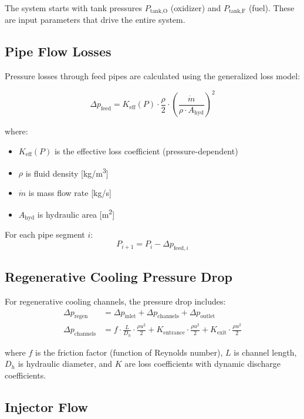 \documentclass[12pt,a4paper]{article}
\newcommand{\mdot}{\dot{m}}
\newcommand{\PtankO}{P_{\text{tank,O}}}
\newcommand{\PtankF}{P_{\text{tank,F}}}
\begin{document}
The system starts with tank pressures $\PtankO$ (oxidizer) and $\PtankF$ (fuel). These are input parameters that drive the entire system.

\subsection{Pipe Flow Losses}

Pressure losses through feed pipes are calculated using the generalized loss model:

\begin{equation}
\Delta p_{\text{feed}} = K_{\text{eff}}(P) \cdot \frac{\rho}{2} \cdot \left(\frac{\mdot}{\rho \cdot A_{\text{hyd}}}\right)^2
\end{equation}

where:
\begin{itemize}
    \item $K_{\text{eff}}(P)$ is the effective loss coefficient (pressure-dependent)
    \item $\rho$ is fluid density [\si{kg/m^3}]
    \item $\mdot$ is mass flow rate [\si{kg/s}]
    \item $A_{\text{hyd}}$ is hydraulic area [\si{m^2}]
\end{itemize}

For each pipe segment $i$:
\begin{equation}
P_{i+1} = P_i - \Delta p_{\text{feed},i}
\end{equation}

\subsection{Regenerative Cooling Pressure Drop}

For regenerative cooling channels, the pressure drop includes:
\begin{align}
\Delta p_{\text{regen}} &= \Delta p_{\text{inlet}} + \Delta p_{\text{channels}} + \Delta p_{\text{outlet}} \\
\Delta p_{\text{channels}} &= f \cdot \frac{L}{D_h} \cdot \frac{\rho u^2}{2} + K_{\text{entrance}} \cdot \frac{\rho u^2}{2} + K_{\text{exit}} \cdot \frac{\rho u^2}{2}
\end{align}

where $f$ is the friction factor (function of Reynolds number), $L$ is channel length, $D_h$ is hydraulic diameter, and $K$ are loss coefficients with dynamic discharge coefficients.

\subsection{Injector Flow}
\end{document}

